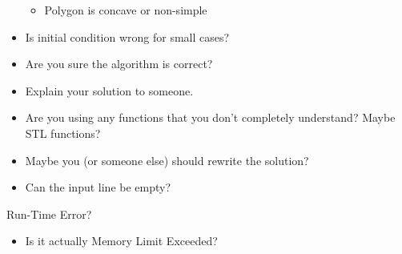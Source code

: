 \begin{myitemize}
\begin{itemize}
\begin{itemize}
                \item Polygon is concave or non-simple
              \end{itemize}
            \item Is initial condition wrong for small cases?
            \item Are you sure the algorithm is correct?
            \item Explain your solution to someone.
            \item Are you using any functions that you don't completely understand? Maybe STL functions?
            \item Maybe you (or someone else) should rewrite the solution?
            \item Can the input line be empty?
          \end{itemize}
        \item Run-Time Error?
          \begin{itemize}
            \item Is it actually Memory Limit Exceeded?
          \end{itemize}
      \end{myitemize}

